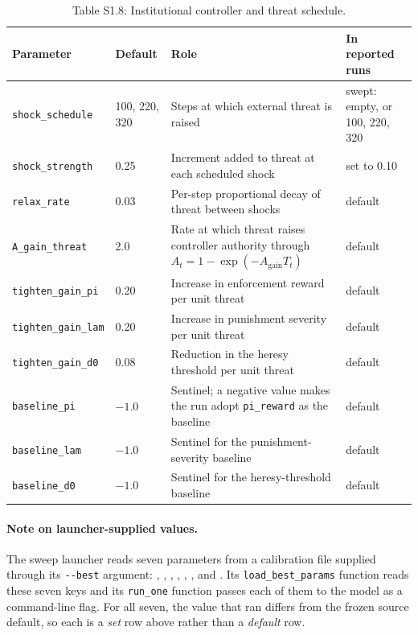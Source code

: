 \documentclass[12pt]{article}
\begin{document}
\begin{table}[htbp]
\centering
\footnotesize
\caption{Table S1.8: Institutional controller and threat schedule.}
\begin{tabular}{p{4.9cm}p{1.3cm}p{4.5cm}p{2.4cm}}
\toprule
Parameter & Default & Role & In reported runs \\
\midrule
\texttt{shock\_schedule} & 100, 220, 320 & Steps at which external threat is raised & swept: empty, or 100, 220, 320 \\
\texttt{shock\_strength} & 0.25 & Increment added to threat at each scheduled shock & set to 0.10 \\
\texttt{relax\_rate} & 0.03 & Per-step proportional decay of threat between shocks & default \\
\texttt{A\_gain\_threat} & 2.0 & Rate at which threat raises controller authority through $A_t=1-\exp(-A_{\mathrm{gain}}T_t)$ & default \\
\texttt{tighten\_gain\_pi} & 0.20 & Increase in enforcement reward per unit threat & default \\
\texttt{tighten\_gain\_lam} & 0.20 & Increase in punishment severity per unit threat & default \\
\texttt{tighten\_gain\_d0} & 0.08 & Reduction in the heresy threshold per unit threat & default \\
\texttt{baseline\_pi} & $-1.0$ & Sentinel; a negative value makes the run adopt \texttt{pi\_reward} as the baseline & default \\
\texttt{baseline\_lam} & $-1.0$ & Sentinel for the punishment-severity baseline & default \\
\texttt{baseline\_d0} & $-1.0$ & Sentinel for the heresy-threshold baseline & default \\
\bottomrule
\end{tabular}
\end{table}

\paragraph{Note on launcher-supplied values.}
The sweep launcher  reads seven
parameters from a calibration file supplied through its \texttt{-{}-best}
argument: , ,
, ,
, , and
. Its \texttt{load\_best\_params} function reads these seven
keys and its \texttt{run\_one} function passes each of them to the model as a
command-line flag. For all seven, the value that ran differs from the frozen
source default, so each is a \emph{set} row above rather than a \emph{default}
row.
\end{document}
